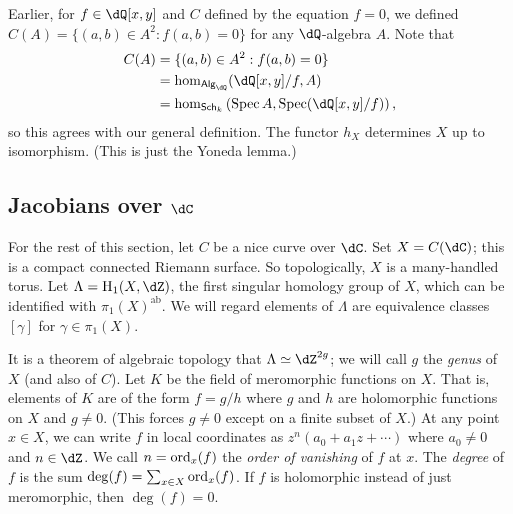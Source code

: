 \documentclass{article}
\begin{document}
Earlier, for $f\in \dQ[x,y]$ and $C$ defined by the equation $f=0$, we 
defined $C(A)=\{(a,b)\in A^2:f(a,b)=0\}$ for any $\dQ$-algebra $A$. 
Note that 
\begin{align*}
  C(A) &= \{(a,b)\in A^2:f(a,b) = 0\} \\
    &= \hom_{\mathsf{Alg}_\dQ}(\dQ[x,y]/f,A) \\
    &= \hom_{\mathsf{Sch}_k}\left(\spec A,\spec(\dQ[x,y]/f)\right) \text{,}
\end{align*}
so this agrees with our general definition. The functor $h_X$ determines $X$ 
up to isomorphism. (This is just the Yoneda lemma.)






\subsection*{Jacobians over $\dC$}

For the rest of this section, let $C$ be a nice curve over $\dC$. Set 
$X=C(\dC)$; this is a compact connected Riemann surface. So 
topologically, $X$ is a many-handled torus. Let $\Lambda=\h_1(X,\dZ)$, 
the first singular homology group of $X$, which can be identified with 
$\pi_1(X)^\text{ab}$. We will regard elements of $\Lambda$ are equivalence 
classes $[\gamma]$ for $\gamma\in \pi_1(X)$. 


It is a theorem of algebraic topology that $\Lambda\simeq\dZ^{2 g}$; we 
will call $g$ the \emph{genus} of $X$ (and also of $C$). Let $K$ be the field 
of meromorphic functions on $X$. That is, elements of $K$ are of the 
form $f=g/h$ where $g$ and $h$ are holomorphic functions on $X$ and $g\ne 0$. 
(This forces $g\ne 0$ except on a finite subset of $X$.) At any point 
$x\in X$, we can write $f$ in local coordinates as $z^n(a_0+a_1 z+\cdots)$ 
where $a_0\ne 0$ and $n\in\dZ$. We call $n=\operatorname{ord}_x(f)$ the \emph{order 
of vanishing} of $f$ at $x$. The \emph{degree} of $f$ is the sum 
$\deg(f)=\sum_{x\in X}\operatorname{ord}_x(f)$. If $f$ is holomorphic instead of just 
meromorphic, then $\deg(f)=0$.  
 
\end{document}
